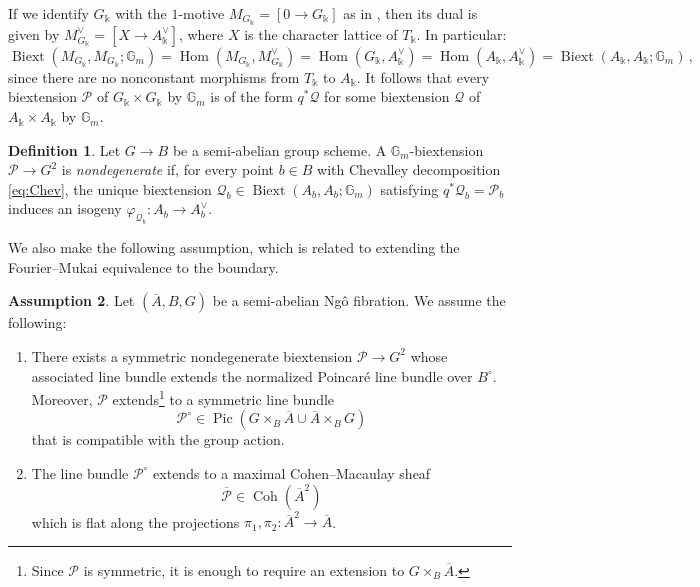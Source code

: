 \documentclass[11pt]{article}
\DeclareMathOperator{\Hom}{Hom}
\def\Pbar{\overline{\mathcal{P}}}
\newcommand{\barA}{\overline{A}}
\newcommand{\Pic}{\operatorname{Pic}}
\theoremstyle{definition}
\newtheorem{definition}{Definition}[section]
\newtheorem{assumption}[definition]{Assumption}
\begin{document}
If we identify $G_{\Bbbk}$ with the $1$-motive
    $M_{G_{\Bbbk}} = [0 \to G_{\Bbbk}]$ as in \cite{Hodge3}, then its dual is given by $M_{G_\Bbbk}^\vee = [X \to A_{\Bbbk}^\vee]$, where $X$ is the character lattice of $T_{\Bbbk}$. In particular:
    $$
    \operatorname{Biext}(M_{G_\Bbbk}, M_{G_\Bbbk}; \mathbb G_m) = \Hom(M_{G_{\Bbbk}}, M_{G_\Bbbk}^\vee) = \Hom(G_{\Bbbk}, A_{\Bbbk}^\vee) = \Hom(A_{\Bbbk}, A_{\Bbbk}^\vee) = \operatorname{Biext}(A_{\Bbbk}, A_{\Bbbk}; \mathbb G_m)\, ,
    $$
    since there are no nonconstant morphisms from $T_{\Bbbk}$ to $A_{\Bbbk}$. It follows that every biextension $\mathcal P$ of $G_\Bbbk\times G_\Bbbk$ by $\mathbb{G}_{m}$ is of the form $q^* \mathcal Q$ for some biextension $\mathcal Q$ of $A_\Bbbk\times A_\Bbbk$ by $\mathbb{G}_{m}$.

\begin{definition}
    Let $G\to B$ be a semi-abelian group scheme. A $\mathbb G_m$-biextension $\mathcal P \to G^2$ is
    \emph{nondegenerate} if, for every point $b \in B$ with Chevalley
    decomposition \eqref{eq:Chev}, the unique biextension
    $\mathcal Q_b \in \operatorname{Biext}(A_b,A_b;\mathbb G_m)$ satisfying
    $q^*\mathcal Q_b = \mathcal P_b$ induces an isogeny
    $\varphi_{\mathcal Q_b} : A_b \to A_b^\vee$.
\end{definition}

We also make the following assumption, which is related to extending the Fourier--Mukai equivalence to the boundary.

\begin{assumption}\label{assum1}
    Let $(\barA,B,G)$ be a semi-abelian Ng\^o fibration. We assume the following:
    \begin{enumerate}[label=(\alph*)]
        \item There exists a symmetric nondegenerate biextension
        $\mathcal P \to G^2$ whose associated line bundle extends the
        normalized Poincar\'e line bundle over $B^\circ$. Moreover,
        $\mathcal P$ extends\footnote{Since $\mathcal P$ is symmetric, it is
        enough to require an extension to
        $ G \times_B \barA$.} to a symmetric line bundle
        \[
        \mathcal P^\circ \in \Pic(G \times_B \barA \cup \barA \times_B G)
        \]
        that is compatible with the group action.

        \item The line bundle $\mathcal P^\circ$ extends to a maximal
        Cohen--Macaulay sheaf
        \[
        \Pbar \in \operatorname{Coh}(\barA^2)
        \]
        which is flat along the projections
        $\pi_1,\pi_2 : \barA^2 \to \barA$.


    \end{enumerate}
\end{assumption}
\end{document}
